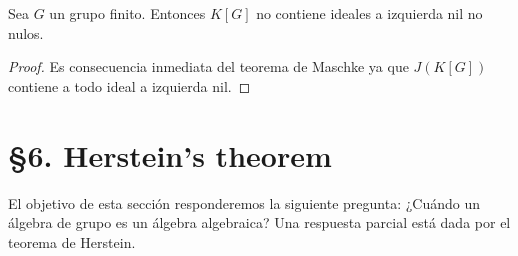 \begin{corollary}
	\label{cor:GfinitoNOnil}
	Sea $G$ un grupo finito. Entonces $K[G]$ no contiene ideales a izquierda
	nil no nulos.
\end{corollary}

\begin{proof}
	Es consecuencia inmediata del teorema de Maschke ya que $J(K[G])$ contiene a
	todo ideal a izquierda nil.	
\end{proof}

%
%
%


\section*{\S6. Herstein's theorem}

El objetivo de esta sección responderemos la siguiente pregunta: ¿Cuándo un
álgebra de grupo es un álgebra algebraica? Una respuesta parcial está dada por
el teorema de Herstein. 

